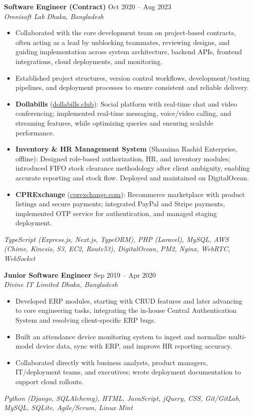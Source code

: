 \documentclass[a4paper,10pt]{article}
\begin{document}
\vspace{1pt}

\textbf{Software Engineer (Contract)} \hfill Oct 2020 -- Aug 2023\\[-2pt]
\textit{Omnisoft Lab \textbar{} Dhaka, Bangladesh}\\[-4pt]
\begin{itemize}
  \item Collaborated with the core development team on project-based contracts, often acting as a lead by unblocking teammates, reviewing designs, and guiding implementation across system architecture, backend APIs, frontend integrations, cloud deployments, and monitoring.
  \item Established project structures, version control workflows, development/testing pipelines, and deployment processes to ensure consistent and reliable delivery.
  \item \textbf{Dollabills} (\href{https://dollabills.club}{dollabills.club}): Social platform with real-time chat and video conferencing; implemented real-time messaging, voice/video calling, and streaming features, while optimizing queries and ensuring scalable performance.  
  \item \textbf{Inventory \& HR Management System} (Shamima Rashid Enterprise, offline): Designed role-based authorization, HR, and inventory modules; introduced FIFO stock clearance methodology after client ambiguity, enabling accurate reporting and stock flow. Deployed and maintained on DigitalOcean.
  \item \textbf{CPRExchange} (\href{https://cprexchange.com}{cprexchange.com}): Recommerce marketplace with product listings and secure payments; integrated PayPal and Stripe payments, implemented OTP service for authentication, and managed staging deployment.
  \end{itemize}
\emph{TypeScript (Express.js, Next.js, TypeORM), PHP (Laravel), MySQL, AWS (Chime, Kinesis, S3, EC2, Route53), DigitalOcean, PM2, Nginx, WebRTC, WebSocket}

\vspace{1pt}

\textbf{Junior Software Engineer} \hfill Sep 2019 -- Apr 2020\\[-2pt]
\textit{Divine IT Limited \textbar{} Dhaka, Bangladesh}\\[-4pt]
\begin{itemize}
  \item Developed ERP modules, starting with CRUD features and later advancing to core engineering tasks, integrating the in-house Central Authentication System and resolving client-specific ERP bugs.
  \item Built an attendance device monitoring system to ingest and normalize multi-model device data, sync with ERP, and improve HR reporting accuracy.
  \item Collaborated directly with business analysts, product managers, IT/deployment teams, and executives; wrote deployment documentation to support cloud rollouts.
\end{itemize}
\emph{Python (Django, SQLAlchemy), HTML, JavaScript, jQuery, CSS, Git/GitLab, MySQL, SQLite, Agile/Scrum, Linux Mint}
\end{document}
